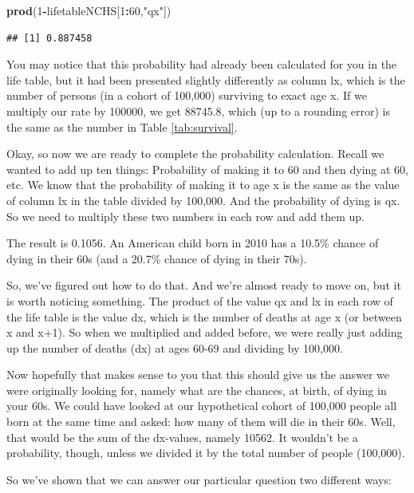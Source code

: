 \documentclass[openany]{book}
\newenvironment{Shaded}{\begin{snugshade}}{\end{snugshade}}
\newcommand{\DecValTok}[1]{\textcolor[rgb]{0.00,0.00,0.81}{#1}}
\newcommand{\KeywordTok}[1]{\textcolor[rgb]{0.13,0.29,0.53}{\textbf{#1}}}
\newcommand{\NormalTok}[1]{#1}
\newcommand{\OperatorTok}[1]{\textcolor[rgb]{0.81,0.36,0.00}{\textbf{#1}}}
\newcommand{\StringTok}[1]{\textcolor[rgb]{0.31,0.60,0.02}{#1}}
\begin{document}
\begin{Shaded}
\begin{Highlighting}[]
\KeywordTok{prod}\NormalTok{(}\DecValTok{1}\OperatorTok{-}\NormalTok{lifetableNCHS[}\DecValTok{1}\OperatorTok{:}\DecValTok{60}\NormalTok{,}\StringTok{"qx"}\NormalTok{])}
\end{Highlighting}
\end{Shaded}

\begin{verbatim}
## [1] 0.887458
\end{verbatim}

You may notice that this probability had already been calculated for you in the life table, but it had been presented slightly differently as column lx, which is the number of persons (in a cohort of 100,000) surviving to exact age x. If we multiply our rate by 100000, we get 88745.8, which (up to a rounding error) is the same as the number in Table \ref{tab:survival}.

Okay, so now we are ready to complete the probability calculation. Recall we wanted to add up ten things: Probability of making it to 60 and then dying at 60, etc. We know that the probability of making it to age x is the same as the value of column lx in the table divided by 100,000. And the probability of dying is qx. So we need to multiply these two numbers in each row and add them up.

The result is 0.1056. An American child born in 2010 has a 10.5\% chance of dying in their 60s (and a 20.7\% chance of dying in their 70s).

So, we've figured out how to do that. And we're almost ready to move on, but it is worth noticing something. The product of the value qx and lx in each row of the life table is the value dx, which is the number of deaths at age x (or between x and x+1). So when we multiplied and added before, we were really just adding up the number of deaths (dx) at ages 60-69 and dividing by 100,000.

Now hopefully that makes sense to you that this should give us the answer we were originally looking for, namely what are the chances, at birth, of dying in your 60s. We could have looked at our hypothetical cohort of 100,000 people all born at the same time and asked: how many of them will die in their 60s. Well, that would be the sum of the dx-values, namely 10562. It wouldn't be a probability, though, unless we divided it by the total number of people (100,000).

So we've shown that we can answer our particular question two different ways:
\end{document}
